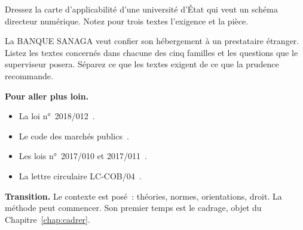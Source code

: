 \begin{boxexo}[title={\ding{45}\quad Exercice~7.3. Carte d'une université \niveaumoyen}]
Dressez la carte d'applicabilité d'une université d'État qui veut un schéma directeur numérique. Notez pour trois textes l'exigence et la pièce.
\end{boxexo}

\begin{boxexo}[title={\ding{45}\quad Exercice~7.4. La banque sous-traite \niveauexpert}]
La BANQUE SANAGA veut confier son hébergement à un prestataire étranger. Listez les textes concernés dans chacune des cinq familles et les questions que le superviseur posera. Séparez ce que les textes exigent de ce que la prudence recommande.
\end{boxexo}

\bigskip

\begin{boxinfo}
\textbf{Pour aller plus loin.}
\begin{itemize}
    \item La loi n°~2018/012~\cite{loi2018012}.
    \item Le code des marchés publics~\cite{decret2018366}.
    \item Les lois n°~2017/010 et 2017/011~\cite{loi2017010,loi2017011}.
    \item La lettre circulaire LC-COB/04~\cite{cobac2022lc}.
\end{itemize}
\end{boxinfo}

\begin{boxinfo}
\textbf{Transition.} Le contexte est posé~: théories, normes, orientations, droit. La méthode peut commencer. Son premier temps est le cadrage, objet du Chapitre~\ref{chap:cadrer}.
\end{boxinfo}

